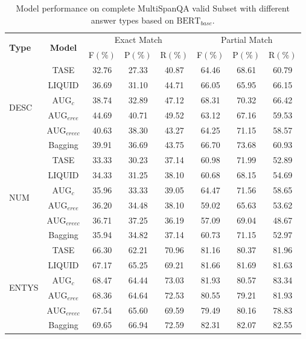 \documentclass[a4paper,fleqn,twocolumn]{cas-dc}
\newcommand{\1}[1]{\mathds{1}\left[#1\right]}
\begin{document}
	
	\begin{table}[ht]
		\caption{Model performance on complete MultiSpanQA valid Subset with different answer types based on $\text{BERT}_{base}$.}
		\label{tab:bertsub}
		\begin{tabular*}{\textwidth}{@{\extracolsep{\fill}}lccccccc}
			\toprule
			\multirow{2}{*}{\textbf{Type}} & \multirow{2}{*}{\textbf{Model}} & \multicolumn{3}{c}{Exact Match} & \multicolumn{3}{c}{Partial Match} \\
			\cmidrule{3-8} 
			& & F\((\%)\) & P\((\%)\) & R\((\%)\) & F\((\%)\) & P\((\%)\) & R\((\%)\) \\
			\midrule
			\multirow{6}{*}{DESC} & TASE & 32.76 & 27.33 & 40.87 & 64.46 & 68.61 & 60.79 \\ 
			& LIQUID & 36.69 & 31.10 & 44.71 & 66.05 & 65.95 & 66.15 \\
			& $\text{AUG}_{c}$ & 38.74 & 32.89 & 47.12 & 68.31 & 70.32 & 66.42 \\
			& $\text{AUG}_{eree}$ & 44.69 & 40.71 & 49.52 & 63.12 & 67.16 & 59.53 \\
			& $\text{AUG}_{ereec}$ & 40.63 & 38.30 & 43.27 & 64.25 & 71.15 & 58.57 \\
			& Bagging & 39.91 & 36.69 & 43.75 & 66.70 & 73.68 & 60.93 \\
			\midrule
			\multirow{6}{*}{NUM} & TASE & 33.33 & 30.23 & 37.14 & 60.98 & 71.99 & 52.89 \\ 
			& LIQUID & 34.33 & 31.25 & 38.10 & 60.68 & 68.15 & 54.69 \\
			& $\text{AUG}_{c}$ & 35.96 & 33.33 & 39.05 & 64.47 & 71.56 & 58.65 \\
			& $\text{AUG}_{eree}$ & 36.20 & 34.48 & 38.10 & 59.02 & 65.63 & 53.62 \\
			& $\text{AUG}_{ereec}$ & 36.71 & 37.25 & 36.19 & 57.09 & 69.04 & 48.67 \\
			& Bagging & 35.94 & 34.82 & 37.14 & 60.73 & 71.15 & 52.97 \\
			\midrule
			\multirow{6}{*}{ENTYS} & TASE & 66.30 & 62.21 & 70.96 & 81.16 & 80.37 & 81.96 \\ 
			& LIQUID & 67.17 & 65.25 & 69.21 & 81.66 & 81.69 & 81.63 \\
			& $\text{AUG}_{c}$ & 68.47 & 64.44 & 73.03 & 81.93 & 80.57 & 83.34 \\
			& $\text{AUG}_{eree}$ & 68.36 & 64.64 & 72.53 & 80.55 & 79.21 & 81.93 \\
			& $\text{AUG}_{ereec}$ & 67.54 & 65.60 & 69.59 & 79.49 & 80.16 & 78.83 \\
			& Bagging & 69.65 & 66.94 & 72.59 & 82.31 & 82.07 & 82.55 \\
			\bottomrule
		\end{tabular*}
	\end{table}
	
\end{document}
